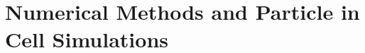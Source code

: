 \documentclass[12pt, class=report, crop=false]{standalone}
\begin{document}
\chapter{Numerical Methods and Particle in Cell Simulations}%
\label{chap:results}
\end{document}
